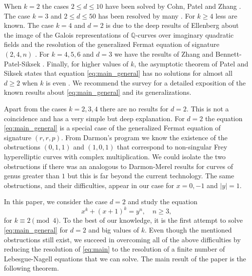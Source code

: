 \documentclass[12pt]{amsart}
\numberwithin{equation}{section}
\theoremstyle{definition}
\theoremstyle{remark}
\newcommand{\QQ}{\mathbb{Q}}
\begin{document}
When $k=2$ the cases $2\leq d\leq 10$ have been solved by Cohn, Patel and Zhang \cite{Cohn96, Zhang14, Patel18}. The case $k=3$ and $2\leq d\leq 50$ has been resolved by many \cite{Uchiyama79, Cassels85, Stroeker95, Zhang14, BennettPatelSiksek17}. For $k\geq 4$ less are known. The case $k=4$ and $d=2$ is due to the deep results of Ellenberg about the image of the Galois representations of $\QQ$-curves over imaginary quadratic fields and the resolution of the generalized Fermat equation of signature $(2,4,n)$ \cite{Ellenberg04, BennettEllenbergNg10}. For $k=4,5,6$ and $d=3$ we have the results of Zhang and Bennett-Patel-Siksek \cite{Zhang14, BennettPatelSiksek16}. Finally, for higher values of $k$, the asymptotic theorem of Patel and Siksek states that equation \eqref{eq:main_general} has no solutions for almost all $d\geq 2$ when $k$ is even \cite{PatelSiksek17}. We recommend the survey \cite{CoppolaCurcoKhawajaPatelUlkem24} for a detailed exposition of the known results about \eqref{eq:main_general} and its generalizations.

Apart from the cases $k=2,3,4$ there are no results for $d=2$. This is not a coincidence and has a very simple but deep explanation. For $d=2$ the equation \eqref{eq:main_general} is a special case of the generalized Fermat equation of signature $(r,r,p)$. From Darmon's program \cite{Darmon00} we know the existence of the obstructions $(0, 1, 1)$ and $(1, 0, 1)$ that correspond to non-singular Frey hyperelliptic curves with complex multiplication. We could isolate the two obstructions if there was an analogous to Darmon-Merel results \cite{DarmonMerel97} for curves of genus greater than $1$ but this is far beyond the current technology. The same obstructions, and their difficulties, appear in our case for $x=0, -1$ and $|y|=1$.

In this paper, we consider the case $d=2$ and study the equation 
\begin{equation}\label{eq:main}
    x^k + (x+1)^k = y^n, \quad n\geq 3, 
\end{equation}
for $k\equiv 2\pmod{4}$. To the best of our knowledge, it is the first attempt to solve \eqref{eq:main_general} for $d=2$ and big values of $k$. Even though the mentioned obstructions still exist, we succeed in overcoming all of the above difficulties by reducing the resolution of \eqref{eq:main} to the resolution of a finite number of Lebesgue-Nagell equations that we can solve. The main result of the paper is the following theorem.
\end{document}
